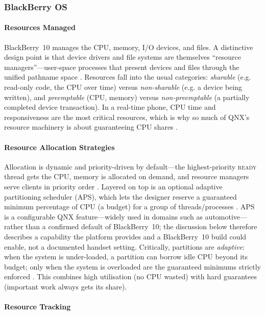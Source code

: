 \subsubsection{BlackBerry OS}

\paragraph{Resources Managed}

BlackBerry~10 manages the CPU, memory, I/O devices, and files. A
distinctive design point is that device drivers and file systems are
themselves ``resource managers''---user-space processes that present
devices and files through the unified pathname space
\citep{qnx_memman, qnx_powersafe_fs}. Resources fall into the usual
categories: \emph{sharable} (e.g. read-only code, the CPU over time)
versus \emph{non-sharable} (e.g. a device being written), and
\emph{preemptable} (CPU, memory) versus \emph{non-preemptable} (a
partially completed device transaction). In a real-time phone, CPU
time and responsiveness are the most critical resources, which is why
so much of QNX's resource machinery is about guaranteeing CPU shares
\citep{qnx_aps}.

\paragraph{Resource Allocation Strategies}

Allocation is dynamic and priority-driven by default---the
highest-priority \textsc{ready} thread gets the CPU, memory is
allocated on demand, and resource managers serve clients in priority
order \citep{qnx_kernel_sysarch, qnx_memman}. Layered on top is an optional
adaptive partitioning scheduler (APS), which lets the designer reserve
a guaranteed minimum percentage of CPU (a budget) for a group of
threads/processes \citep{qnx_aps}. APS is a configurable QNX
feature---widely used in domains such as automotive---rather than a
confirmed default of BlackBerry~10; the discussion below therefore
describes a capability the platform provides and a BlackBerry~10 build
could enable, not a documented handset setting. Critically, partitions
are \emph{adaptive}: when the system is under-loaded, a partition can
borrow idle CPU beyond its budget; only when the system is overloaded
are the guaranteed minimums strictly enforced
\citep{qnx_aps}. This combines high utilisation (no CPU
wasted) with hard guarantees (important work always gets its share).

\paragraph{Resource Tracking}

